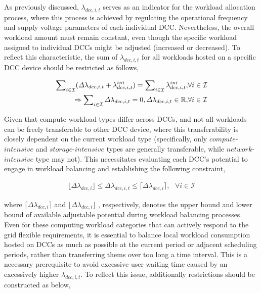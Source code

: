 \documentclass[lettersize,journal]{IEEEtran}
\begin{document}
As previously discussed, \(\lambda_{dcc,i,t} \) serves as an indicator for the workload allocation process, where this process is achieved by regulating the operational frequency and supply voltage parameters of each individual DCC. Nevertheless, the overall workload amount must remain constant, even though the specific workload assigned to individual DCCs might be adjusted (increased or decreased). To reflect this characteristic, the sum of \(\lambda_{dcc,i,t}\) for all workloads hosted on a specific DCC device should be restricted as follows,

\vspace{-0.25cm}
\begin{subequations}
\begin{align}
  \sum\nolimits_{i\in\mathcal{I}} (\varDelta \lambda_{dcc,i,t} + \lambda_{dcc,i,t}^{ini} ) = \sum\nolimits_{i\in\mathcal{I}} \lambda_{dcc,i,t}^{ini},  &\forall i\in\mathcal{I} \notag\\
  \Rightarrow \sum\nolimits_{i\in\mathcal{I}} \varDelta \lambda_{dcc,i,t} = 0,\varDelta \lambda_{dcc,i,t} \in\mathbb{R}, &\forall i\in\mathcal{I}
\end{align}
\end{subequations}

Given that compute workload types differ across DCCs, and not all workloads can be freely transferable to other DCC device, where this transferability is closely dependent on the current workload type (specifically, only $compute$-$intensive$ and $storage$-$intensive$ types are generally transferable, while $network$-$intensive$ type may not). This necessitates evaluating each DCC's potential to engage in workload balancing and establishing the following constraint,

\vspace{-0.25cm}
\begin{subequations}
\begin{align}
  \lfloor \varDelta \lambda_{dcc,i} \rfloor \leq \varDelta \lambda_{dcc,i,t} \leq \lceil\varDelta \lambda_{dcc,i} \rceil, \,\,\,\, \forall i\in\mathcal{I}
\end{align}
\end{subequations}

\noindent
where $\lceil {\varDelta \lambda_{dcc,i}} \rceil$ and $\lfloor {\varDelta \lambda_{dcc,i}} \rfloor$ , respectively, denotes the upper bound and lower bound of available adjustable potential during workload balancing processes.
Even for these computing workload categories that can actively respond to the grid flexible requirements, it is essential to balance local workload consumption hosted on DCCs as much as possible at the current period or adjacent scheduling periods, rather than transferring thems over too long a time interval. This is a necessary prerequisite to avoid excessive user waiting time caused by an excessively higher \(\lambda_{dcc,i,t}\). To reflect this issue, additionally restrictions should be constructed as below,
\end{document}
